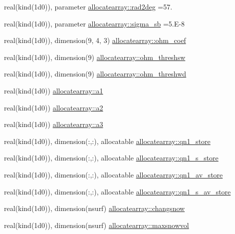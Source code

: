 \begin{DoxyCompactItemize}
\item 
real(kind(1d0)), parameter \hyperlink{namespaceallocatearray_a7d3aff15bbe8e1dec4e224f4fa5b244f}{allocatearray\+::rad2deg} =57.
\item 
real(kind(1d0)), parameter \hyperlink{namespaceallocatearray_a91279585f00cf4382f539354751bf02f}{allocatearray\+::sigma\+\_\+sb} =5.\+E-\/8
\item 
real(kind(1d0)), dimension(9, 4, 3) \hyperlink{namespaceallocatearray_aa455ec06de0d5f8b24b5a991a07b32c1}{allocatearray\+::ohm\+\_\+coef}
\item 
real(kind(1d0)), dimension(9) \hyperlink{namespaceallocatearray_a8b9a218b05df6fa11170f787d62e5ed4}{allocatearray\+::ohm\+\_\+threshsw}
\item 
real(kind(1d0)), dimension(9) \hyperlink{namespaceallocatearray_a138caba870c7f698f4b833e019b2c794}{allocatearray\+::ohm\+\_\+threshwd}
\item 
real(kind(1d0)) \hyperlink{namespaceallocatearray_ad46985325048552753cfa81641ff8b0f}{allocatearray\+::a1}
\item 
real(kind(1d0)) \hyperlink{namespaceallocatearray_a0cad51c36be0d8e5f907e24f9c391e4e}{allocatearray\+::a2}
\item 
real(kind(1d0)) \hyperlink{namespaceallocatearray_ac17d9365b9163e951de7ce3f5fa21897}{allocatearray\+::a3}
\item 
real(kind(1d0)), dimension(\+:,\+:), allocatable \hyperlink{namespaceallocatearray_aef0f065addcafc27e8adbf9c9f9f867f}{allocatearray\+::qn1\+\_\+store}
\item 
real(kind(1d0)), dimension(\+:,\+:), allocatable \hyperlink{namespaceallocatearray_a29c0ea0741af8fff0b282998c49da9a1}{allocatearray\+::qn1\+\_\+s\+\_\+store}
\item 
real(kind(1d0)), dimension(\+:,\+:), allocatable \hyperlink{namespaceallocatearray_ad5f385f647d84ed863fbfe5ae0754b28}{allocatearray\+::qn1\+\_\+av\+\_\+store}
\item 
real(kind(1d0)), dimension(\+:,\+:), allocatable \hyperlink{namespaceallocatearray_a7d2779bd8ecaa17c3f07c18a936d2150}{allocatearray\+::qn1\+\_\+s\+\_\+av\+\_\+store}
\item 
real(kind(1d0)), dimension(nsurf) \hyperlink{namespaceallocatearray_a215dffcb1ced9f49787128f695cbf8d7}{allocatearray\+::changsnow}
\item 
real(kind(1d0)), dimension(nsurf) \hyperlink{namespaceallocatearray_aec874041558b5b832c4ebefb21848bef}{allocatearray\+::maxsnowvol}
\item 

\end{DoxyCompactItemize}
